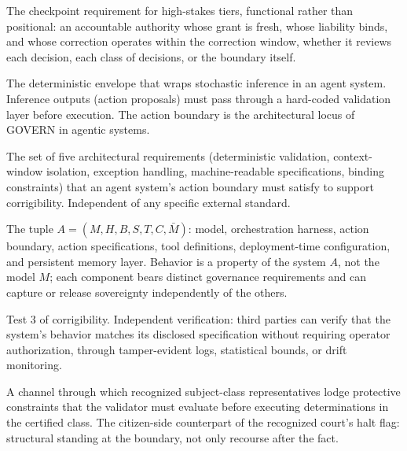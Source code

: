 
\providecommand{\glossentry}[1]{\needspace{4\baselineskip}\item[#1]}

\begin{description}[style=nextline, leftmargin=1.5em, font=\normalfont\bfseries]

\glossentry{Accountable-Authority Checkpoint}
The checkpoint requirement for high-stakes tiers, functional rather
than positional: an accountable authority whose grant is fresh, whose
liability binds, and whose correction operates within the correction
window, whether it reviews each decision, each class of decisions, or
the boundary itself.

\glossentry{Action Boundary}
The deterministic envelope that wraps stochastic inference in an agent
system. Inference outputs (action proposals) must pass through a
hard-coded validation layer before execution. The action boundary is
the architectural locus of GOVERN in agentic systems.

\glossentry{Action Boundary Protocol}
The set of five architectural requirements (deterministic validation,
context-window isolation, exception handling, machine-readable
specifications, binding constraints) that an agent system's action
boundary must satisfy to support corrigibility. Independent of any
specific external standard.

\glossentry{Agent System}
The tuple $A = (M, H, B, S, T, C, \bar{M})$: model, orchestration
harness, action boundary, action specifications, tool definitions,
deployment-time configuration, and persistent memory layer. Behavior
is a property of the system $A$, not the model $M$; each component
bears distinct governance requirements and can capture or release
sovereignty independently of the others.

\glossentry{AUDIT}
Test 3 of corrigibility. Independent verification: third parties can
verify that the system's behavior matches its disclosed specification
without requiring operator authorization, through tamper-evident logs,
statistical bounds, or drift monitoring.

\glossentry{Citizen-Constraint Registry}
A channel through which recognized subject-class representatives lodge
protective constraints that the validator must evaluate before executing
determinations in the certified class. The citizen-side counterpart of
the recognized court's halt flag: structural standing at the boundary,
not only recourse after the fact.


\end{description}
